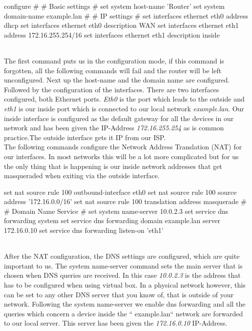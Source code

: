 \begin{cisco}[title=Basic configuration]
configure
#
# Basic settings
#
set system host-name 'Router'
set system domain-name example.lan
#
# IP settings
#
set interfaces ethernet eth0 address dhcp
set interfaces ethernet eth0 description WAN
set interfaces ethernet eth1 address 172.16.255.254/16
set interfaces ethernet eth1 description inside
\end{cisco} \\
The first command puts us in the configuration mode, if this command is forgotten, all the following commands will fail and the router will be left unconfigured. Next up the host-name and the domain name are configured. Followed by the configuration of the interfaces. There are two interfaces configured, both Ethernet ports. \textit{Eth0} is the port which leads to the outside and \textit{eth1} is our inside port which is connected to our local network \textit{example.lan}. Our inside interface is configured as the default gateway for all the devices in our network and has been given the IP-Address \textit{172.16.255.254} as is common practice.The outside interface gets it IP from our ISP.\\
The following commands configure the Network Address Translation (NAT) for our interfaces. In most networks this will be a lot more complicated but for us the only thing that is happening is our inside network addresses that get masqueraded when exiting via the outside interface.
\begin{cisco}[title=NAT configuration]
set nat source rule 100 outbound-interface eth0
set nat source rule 100 source address '172.16.0.0/16'
set nat source rule 100 translation address masquerade
#
# Domain Name Service
#
set system name-server 10.0.2.3
set service dns forwarding system
set service dns forwarding domain example.lan server 172.16.0.10
set service dns forwarding listen-on 'eth1'
\end{cisco}\\
After the NAT configuration, the DNS settings are configured, which are quite important to us. The system name-server command sets the main server that is chosen when DNS queries are received. In this case \textit{10.0.2.3} is the address that has to be configured when using virtual box. In a physical network however, this can be set to any other DNS server that you know of, that is outside of your network. Following the system name-server we enable dns forwarding and all the queries which concern a device inside the `` example.lan`` network are forwarded to our local server. This server has been given the \textit{172.16.0.10} IP-Address.\\
